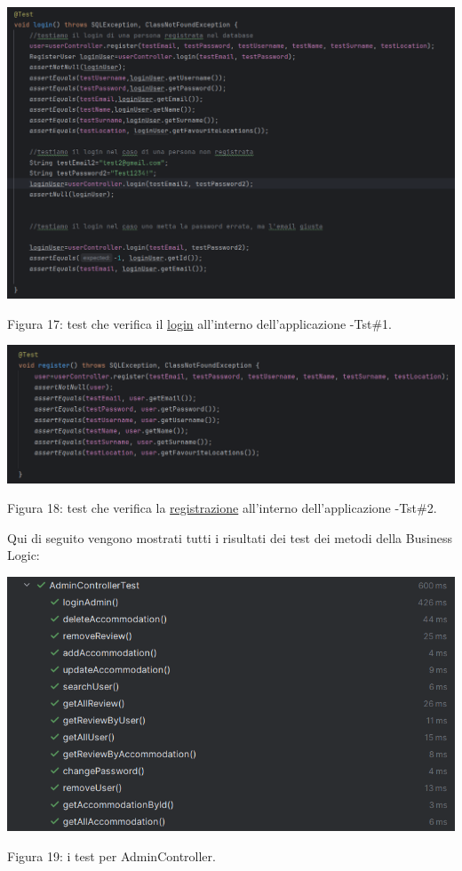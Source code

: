 \documentclass[10pt]{article}
\begin{document}
\label{test1}
\begin{center}
\hspace*{-0.75cm}
\includegraphics[scale=0.55]{test/BusinessLogic/login}
\par\medskip
Figura 17: test che verifica il \hyperref[Usecase1]{login} all'interno dell'applicazione -Tst\#1.
\par\medskip
\end{center}
\label{test2}
\begin{center}
\hspace*{-2cm}
\includegraphics[scale=0.55]{test/BusinessLogic/register}
\par\medskip
Figura 18: test che verifica la \hyperref[Usecase4]{registrazione} all'interno dell'applicazione -Tst\#2.
\par\medskip
\end{center}

Qui di seguito vengono mostrati tutti i risultati dei test dei metodi della Business Logic:

\begin{center}
\includegraphics[scale=0.55]{test/BusinessLogic/testAdminController}
\par\medskip
Figura 19: i test per AdminController.
\par\medskip
\end{center}
\end{document}
